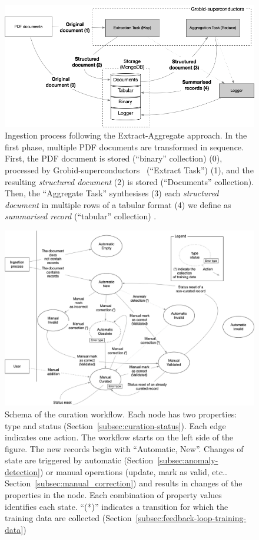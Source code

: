 \documentclass[]{interact}
\theoremstyle{plain} %
\theoremstyle{definition}
\theoremstyle{remark}
\begin{document}
\begin{figure}[ht]
  \centering
  \includegraphics[width=\textwidth]{images/ingestion-schema.png} 
  \caption{Ingestion process following the Extract-Aggregate approach. In the first phase, multiple PDF documents are transformed in sequence. First, the PDF document is stored (``binary'' collection) (0), processed by Grobid-superconductors~\cite{lfoppiano2023automatic} (``Extract Task'') (1), and the resulting \textit{structured document} (2) is stored (``Documents'' collection). 
  Then, the ``Aggregate Task'' synthesises (3) each \textit{structured document} in multiple rows of a tabular format (4) we define as \textit{summarised record} (``tabular'' collection) .}
  \label{fig:map-reduce}
\end{figure}

\begin{figure}[ht]
  \centering
  \includegraphics[width=1\textwidth]{images/record-correction} 
  \caption{Schema of the curation workflow. Each node has two properties: type and status (Section~\ref{subsec:curation-status}). Each edge indicates one action. The workflow starts on the left side of the figure. The new records begin with ``Automatic, New''. Changes of state are triggered by automatic (Section~\ref{subsec:anomaly-detection}) or manual operations (update, mark as valid, etc.. Section~\ref{subsec:manual_correction}) and results in changes of the properties in the node. Each combination of property values identifies each state. ``(*)'' indicates a transition for which the training data are collected (Section~\ref{subsec:feedback-loop-training-data})}
  \label{fig:curation-workflow}
\end{figure}
\end{document}

